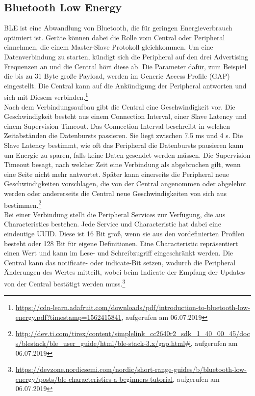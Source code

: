 \subsection{Bluetooth Low Energy}
BLE ist eine Abwandlung von Bluetooth, die für geringen Energieverbrauch optimiert ist.
Geräte können dabei die Rolle vom Central oder Peripheral einnehmen, die einem Master-Slave Protokoll gleichkommen.
Um eine Datenverbindung zu starten, kündigt sich die Peripheral auf den drei Advertising Frequenzen an und die Central hört diese ab.
Die Parameter dafür, zum Beispiel die bis zu 31 Byte große Payload, werden im Generic Access Profile (GAP) eingestellt.
Die Central kann auf die Ankündigung der Peripheral antworten und sich mit Diesem verbinden.\footnote{\url{https://cdn-learn.adafruit.com/downloads/pdf/introduction-to-bluetooth-low-energy.pdf?timestamp=1562415841}, aufgerufen am 06.07.2019}\\
Nach dem Verbindungsaufbau gibt die Central eine Geschwindigkeit vor.
Die Geschwindigkeit besteht aus einem Connection Interval, einer Slave Latency und einem Supervision Timeout.
Das Connection Interval beschreibt in welchen Zeitabständen die Datenbursts passieren.
Sie liegt zwischen 7.5 ms und 4 s.
Die Slave Latency bestimmt, wie oft das Peripheral die Datenbursts pausieren kann um Energie zu sparen, falls keine Daten gesendet werden müssen.
Die Supervision Timeout besagt, nach welcher Zeit eine Verbindung als abgebrochen gilt, wenn eine Seite nicht mehr antwortet.
Später kann einerseits die Peripheral neue Geschwindigkeiten vorschlagen, die von der Central angenommen oder abgelehnt werden oder andererseits die Central neue Geschwindigkeiten von sich aus bestimmen.\footnote{\url{http://dev.ti.com/tirex/content/simplelink\_cc2640r2\_sdk\_1\_40\_00\_45/docs/blestack/ble\_user\_guide/html/ble-stack-3.x/gap.html\#}, aufgerufen am 06.07.2019}\\
Bei einer Verbindung stellt die Peripheral Services zur Verfügung, die aus Characteristics bestehen.
Jede Service und Characteristic hat dabei eine eindeutige UUID.
Diese ist 16 Bit groß, wenn sie aus den vordefinierten Profilen besteht oder 128 Bit für eigene Definitionen.
Eine Characteristic repräsentiert einen Wert und kann im Lese- und Schreibzugriff eingeschränkt werden.
Die Central kann das notificate- oder indicate-Bit setzen, wodurch die Peripheral Änderungen des Wertes mitteilt, wobei beim Indicate der Empfang der Updates von der Central bestätigt werden muss.\footnote{\url{https://devzone.nordicsemi.com/nordic/short-range-guides/b/bluetooth-low-energy/posts/ble-characteristics-a-beginners-tutorial}, aufgerufen am 06.07.2019}\\

